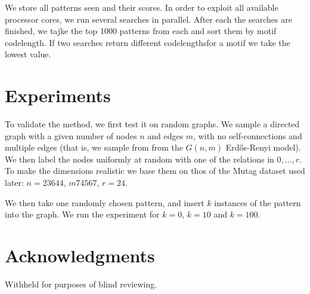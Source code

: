 \documentclass[letterpaper]{article} %
\begin{document}
We store all patterns seen and their scores. In order to exploit all available processor cores, we run several searches in parallel. After each the searches are finished, we tajke the top 1000 patterns from each and sort them by motif codelength. If two searches return different codelengths\footnotemark for a motif we take the lowest value.
 
 
\section{Experiments}

To validate the method, we first test it on random graphs. We sample a directed graph with a given number of nodes $n$ and edges $m$, with no self-connections and multiple edges (that is, we sample from from the $G(n, m)$ Erd\H{o}s-Renyi model). We then label the nodes uniformly at random with one of the relations in $0, \ldots, r$. To make the dimensions realistic we base them on thos of the Mutag dataset used later: $n=23644$, $m74567$, $r=24$.

We then take one randomly chosen pattern, and insert $k$ instances of the pattern into the graph. We run the experiment for $k=0$, $k=10$ and $k=100$.

\section{Acknowledgments}

Withheld for purposes of blind reviewing.



\end{document}
